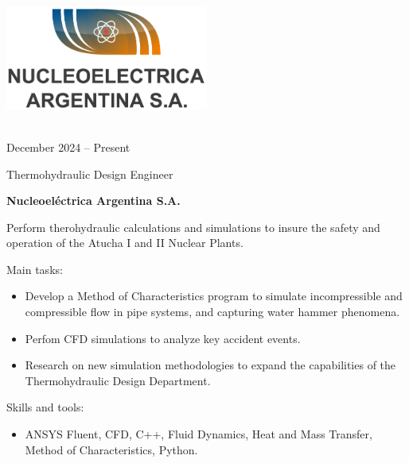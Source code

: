 \documentclass[a4paper,10pt]{article}
\newlength{\cvcolumngapwidth}
\newlength{\cvleftcolumnwidth}
\newlength{\cvrightcolumnwidth}
\newcommand{\cvtitlestyle}[1]{{\large\cvtitlefont\textcolor{cvtitlecolor}{#1}}}
\newcommand{\cvdurationstyle}[1]{{\small\cvdurationfont\textcolor{cvdurationcolor}{#1}}}
\newlength{\cvafteritemskipamount}
\newlength{\cvaftertitleskipamount}
\newlength{\cvparskip}
\newcommand{\cvitem}[2]{
    \begin{minipage}[t]{\cvleftcolumnwidth}
        \raggedleft #1
    \end{minipage}%
    \hspace{\cvcolumngapwidth}%
    \begin{minipage}[t]{\cvrightcolumnwidth}
        \setlength{\parskip}{\cvparskip} #2
    \end{minipage}

    \vspace{\cvafteritemskipamount}
}
\newcommand{\cvtitle}[1]{
    \cvtitlestyle{#1}

    \vspace{\cvaftertitleskipamount}
    \vspace{-\cvparskip}
}
\begin{document}
\cvitem{
	\begin{minipage}{\textwidth}
    \begin{flushright}
		  \includegraphics[width=0.5\textwidth]{../../../../logos-photos/Logo_NASA.png}   
    \end{flushright}  
  \end{minipage} \\
  \vspace{0.3cm}
  \cvdurationstyle{December 2024 -- Present}\\
}{
	
  \cvtitle{Thermohydraulic Design Engineer}
  \textbf{\large Nucleoeléctrica Argentina S.A.}

  Perform therohydraulic calculations and simulations to insure the safety and operation of the Atucha I and II Nuclear
  Plants.

  Main tasks:
  \begin{itemize}
    \item Develop a Method of Characteristics program to simulate incompressible and compressible flow in pipe systems, and
        capturing water hammer phenomena.
    \item Perfom CFD simulations to analyze key accident events. 
    \item Research on new simulation methodologies to expand the capabilities of the Thermohydraulic Design Department.
  \end{itemize}

  Skills and tools:
  \begin{itemize}
      \item ANSYS Fluent, CFD, C++, Fluid Dynamics, Heat and Mass Transfer, Method of Characteristics, Python.
  \end{itemize}
  
}
\end{document}
